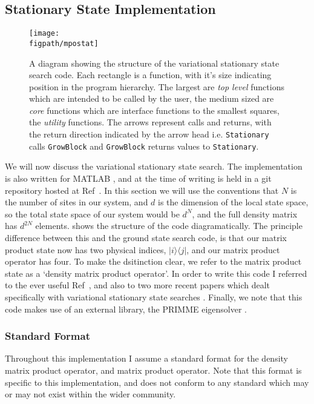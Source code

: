 \FloatBarrier 
 
 \subsection{Stationary State Implementation}
 
 \begin{figure}[ht!]
 \centering
 \texttt{[image: \\figpath/mpostat]}
 \caption{A diagram showing the structure of the variational stationary state search code. Each rectangle is a function, with it's size indicating position in the program hierarchy. The largest are \emph{top level} functions which are intended to be called by the user, the medium sized are \emph{core} functions which are interface functions to the smallest squares, the \emph{utility} functions. The arrows represent calls and returns, with the return direction indicated by the arrow head i.e. \lstinline$Stationary$ calls \lstinline$GrowBlock$ and \lstinline$GrowBlock$ returns values to \lstinline$Stationary$. }
 \label{fig:vs2-2}
 \end{figure} 
 
 We will now discuss the variational stationary state search. The implementation is also written for MATLAB \cite{MATLAB}, and at the time of writing is held in a git repository hosted at Ref~\cite{otb:gitVSSS}. In this section we will use the conventions that \(N\) is the number of sites in our system, and \(d\) is the dimension of the local state space, so the total state space of our system would be \(d^{N}\), and the full density matrix has \(d^{2N}\) elements.  shows the structure of the code diagramatically. The principle difference between this and the ground state search code, is that our matrix product state now has two physical indices, \(|i \rangle \langle j |\), and our matrix product operator has four. To make the dsitinction clear, we refer to the matrix product state as a `density matrix product operator'. In order to write this code I referred to the ever useful Ref~\cite{Schollwoeck11}, and also to two more recent papers which dealt specifically with variational stationary state searches \cite{CCB15,MFS15}. Finally, we note that this code makes use of an external library, the PRIMME eigensolver \cite{SM10,WRS16}.
 
 \subsubsection{Standard Format}
 Throughout this implementation I assume a standard format for the density matrix product operator, and matrix product operator. Note that this format is specific to this implementation, and does not conform to any standard which may or may not exist within the wider community.
